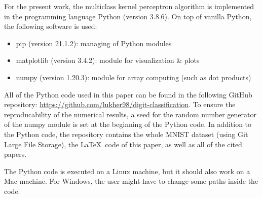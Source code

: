 For the present work, the multiclass kernel perceptron algorithm is implemented in the programming language Python (version 3.8.6).
On top of vanilla Python, the following software is used:
\begin{itemize}
	\item pip (version 21.1.2): managing of Python modules 
	\item matplotlib (version 3.4.2): module for visualization \& plots
	\item numpy (version 1.20.3): module for array computing (such as dot products)
\end{itemize}
All of the Python code used in this paper can be found in the following GitHub repository: \url{https://github.com/lukher98/digit-classification}. To ensure the reproducability of the numerical results, a seed for the random number generator of the numpy module is set at the beginning of the Python code. In addition to the Python code, the repository contains the whole MNIST dataset (using Git Large File Storage), the \LaTeX\ code of this paper, as well as all of the cited papers.

The Python code is executed on a Linux machine, but it should also work on a Mac machine. For Windows, the user might have to change some paths inside the code.